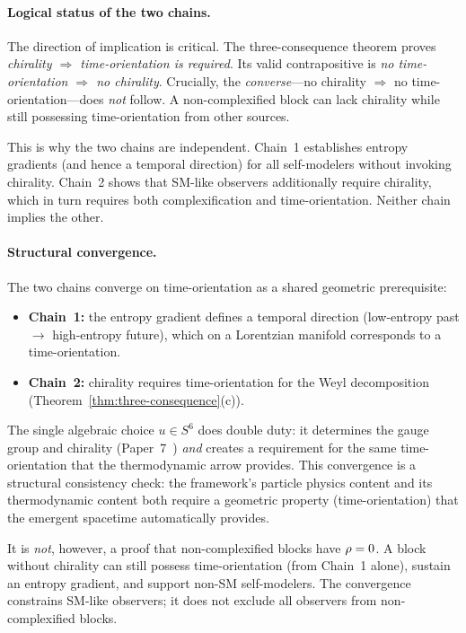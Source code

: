 \paragraph{Logical status of the two chains.}
The direction of implication is critical.  The three-consequence
theorem proves \emph{chirality $\Rightarrow$ time-orientation is
required}.  Its valid contrapositive is \emph{no time-orientation
$\Rightarrow$ no chirality}.  Crucially, the \emph{converse}---no
chirality $\Rightarrow$ no time-orientation---does \emph{not}
follow.  A non-complexified block can lack chirality while still
possessing time-orientation from other sources.

This is why the two chains are independent.  Chain~1 establishes
entropy gradients (and hence a temporal direction) for all
self-modelers without invoking chirality.  Chain~2 shows that
SM-like observers additionally require chirality, which in turn
requires both complexification and time-orientation.  Neither chain
implies the other.

\paragraph{Structural convergence.}
The two chains converge on time-orientation as a shared geometric
prerequisite:
\begin{itemize}
  \item \textbf{Chain~1:} the entropy gradient defines a temporal
    direction (low-entropy past $\to$ high-entropy future),
    which on a Lorentzian manifold corresponds to a
    time-orientation.
  \item \textbf{Chain~2:} chirality requires time-orientation for
    the Weyl decomposition
    (Theorem~\ref{thm:three-consequence}(c)).
\end{itemize}
The single algebraic choice $u \in S^6$ does double duty: it
determines the gauge group and chirality
(Paper~7~\cite{Paper7}) \emph{and} creates a requirement for the
same time-orientation that the thermodynamic arrow provides.  This
convergence is a structural consistency check: the framework's
particle physics content and its thermodynamic content both require
a geometric property (time-orientation) that the emergent spacetime
automatically provides.

It is \emph{not}, however, a proof that non-complexified blocks have
$\rho = 0$.  A block without chirality can still possess
time-orientation (from Chain~1 alone), sustain an entropy gradient,
and support non-SM self-modelers.  The convergence constrains
SM-like observers; it does not exclude all observers from
non-complexified blocks.

